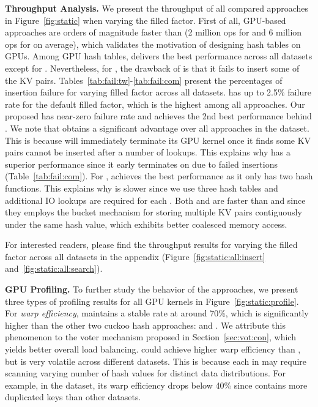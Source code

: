 \vspace{1mm}\noindent\textbf{Throughput Analysis.} We present the throughput of all compared approaches in Figure~\ref{fig:static} when varying the filled factor. 
First of all, GPU-based approaches are orders of magnitude faster than \google (2  million ops for  and 6 million ops for  on average), which validates the motivation of designing hash tables on GPUs. 
Among GPU hash tables, \megakv delivers the best performance across all datasets except for \dsali. Nevertheless, for , the drawback of \megakv is that it fails to insert some of the KV pairs. Tables~\ref{tab:fail:tw}-\ref{tab:fail:com} present the percentages of insertion failure for varying filled factor across all datasets. \megakv has up to 2.5\% failure rate for the default filled factor, which is the highest among all approaches. 
Our proposed \voter has near-zero failure rate and achieves the 2nd best performance behind \megakv. We note that \cudpp obtains a significant advantage over all approaches in the \dsali dataset. This is because \cudpp will immediately terminate its GPU kernel once it finds some KV pairs cannot be inserted after a number of lookups. This explains why \cudpp has a superior performance since it early terminates on \dsali due to failed insertions (Table~\ref{tab:fail:com}). For , \megakv achieves the best performance as it only has two hash functions. This explains why \voter is slower since we use three hash tables and additional IO lookups are required for each . Both \megakv and \voter are faster than \cudpp and \linear since they employs the bucket mechanism for storing multiple KV pairs contiguously under the same hash value, which exhibits better coalesced memory access.  




For interested readers, please find the throughput results for varying the filled factor across all datasets in the appendix (Figure~\ref{fig:static:all:insert} and~\ref{fig:static:all:search}). 





\vspace{1mm}\noindent\textbf{GPU Profiling.} To further study the behavior of the approaches, we present three types of profiling results for all  GPU kernels in Figure~\ref{fig:static:profile}.
For \emph{warp efficiency}, \voter maintains a stable rate at around 70\%, which is significantly higher than the other two cuckoo hash approaches: \megakv and \cudpp.  
We attribute this phenomenon to the voter mechanism proposed in Section~\ref{sec:vot:con}, which yields better overall load balancing. 
\linear could achieve higher warp efficiency than \voter, but is very volatile across different datasets. This is because each  in \linear may require scanning varying number of hash values for distinct data distributions. 
For example, in the \dsali dataset, its warp efficiency drops below 40\% since \dsali contains more duplicated keys than other datasets. 

